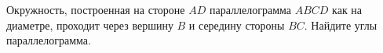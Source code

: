 \begin{ex}
	\begin{condition}
		Окружность, построенная на стороне \( AD \) параллелограмма \( ABCD  \) как на диаметре, проходит через вершину \( B  \) и середину стороны \( BC \). Найдите углы параллелограмма.
	\end{condition}
\end{ex}